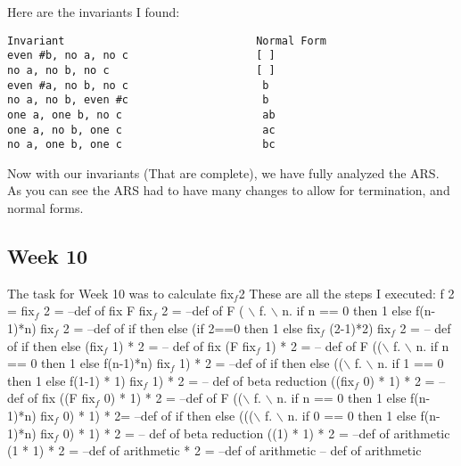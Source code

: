 \documentclass{article}
\theoremstyle{theorem}
\theoremstyle{definition}
\theoremstyle{remark}
\begin{document}
\noindent\newline Here are the invariants I found:
\begin{verbatim}
Invariant                              Normal Form
even #b, no a, no c                    [ ]
no a, no b, no c                       [ ]
even #a, no b, no c                     b
no a, no b, even #c                     b
one a, one b, no c                      ab
one a, no b, one c                      ac
no a, one b, one c                      bc
\end{verbatim}

\noindent\newline Now with our invariants (That are complete), we have fully analyzed the ARS. As you can see the ARS had to have many changes to allow for termination, and normal forms.


  
 \subsection{Week 10}
 The task for Week 10 was to calculate
 \newline
\newline fix$_f$2
 \newline
 \newline These are all the steps I executed: \newline
f 2 = \newline
fix$_f$ 2 =  --def of fix\newline
F fix$_f$ 2  =  --def of F\newline
( $\backslash$ f. $\backslash$ n. if n == 0 then 1 else f(n-1)*n) fix$_f$ 2 =  --def of if then else\newline
(if 2==0 then 1 else fix$_f$ (2-1)*2) fix$_f$ 2 =  -- def of if then else\newline
(fix$_f$ 1) * 2 =  -- def of fix\newline 
(F fix$_f$ 1) * 2  =  -- def of F\newline
(($\backslash$ f. $\backslash$ n. if n == 0 then 1 else f(n-1)*n) fix$_f$ 1) * 2 =  --def of if then else\newline
(($\backslash$ f. $\backslash$ n. if 1 == 0 then 1 else f(1-1) * 1) fix$_f$ 1) * 2 =  -- def of beta reduction\newline
((fix$_f$ 0) * 1) * 2 =  --def of fix\newline
((F fix$_f$ 0) * 1) * 2 =  --def of F\newline
(($\backslash$ f. $\backslash$ n. if n == 0 then 1 else f(n-1)*n) fix$_f$ 0) * 1) * 2=   --def of if then else\newline
((($\backslash$ f. $\backslash$ n. if 0 == 0 then 1 else f(n-1)*n) fix$_f$ 0) * 1) * 2 =  -- def of beta reduction\newline
((1) * 1) * 2 =  --def of arithmetic\newline
(1 * 1) * 2 =  --def of arithmetic  * 2 =   --def of arithmetic   -- def of arithmetic \newline
\end{document}
